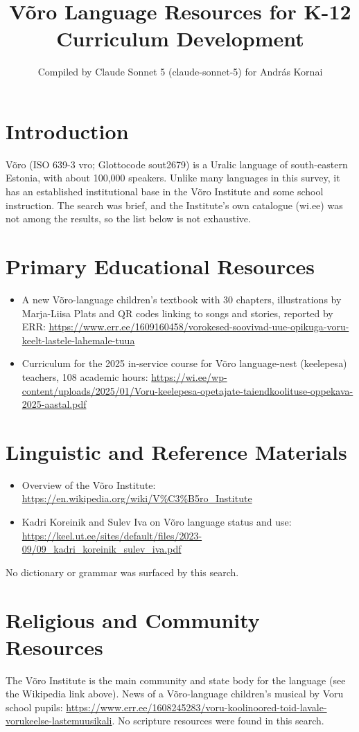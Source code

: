 \documentclass[12pt]{article}
\title{V\~oro Language Resources for K-12 Curriculum Development}
\author{Compiled by Claude Sonnet 5 (claude-sonnet-5) for Andr\'as Kornai}
\date{}
\begin{document}
\maketitle
\section{Introduction}
V\~oro (ISO 639-3 vro; Glottocode sout2679) is a Uralic language of south-eastern Estonia, with about 100,000 speakers. Unlike many languages in this survey, it has an established institutional base in the V\~oro Institute and some school instruction. The search was brief, and the Institute's own catalogue (wi.ee) was not among the results, so the list below is not exhaustive.
\section{Primary Educational Resources}
\begin{itemize}
\item A new V\~oro-language children's textbook with 30 chapters, illustrations by Marja-Liisa Plats and QR codes linking to songs and stories, reported by ERR: \url{https://www.err.ee/1609160458/vorokesed-soovivad-uue-opikuga-voru-keelt-lastele-lahemale-tuua}
\item Curriculum for the 2025 in-service course for V\~oro language-nest (keelepesa) teachers, 108 academic hours: \url{https://wi.ee/wp-content/uploads/2025/01/Voru-keelepesa-opetajate-taiendkoolituse-oppekava-2025-aastal.pdf}
\end{itemize}
\section{Linguistic and Reference Materials}
\begin{itemize}
\item Overview of the V\~oro Institute: \url{https://en.wikipedia.org/wiki/V%C3%B5ro_Institute}
\item Kadri Koreinik and Sulev Iva on V\~oro language status and use: \url{https://keel.ut.ee/sites/default/files/2023-09/09_kadri_koreinik_sulev_iva.pdf}
\end{itemize}
No dictionary or grammar was surfaced by this search.
\section{Religious and Community Resources}
The V\~oro Institute is the main community and state body for the language (see the Wikipedia link above). News of a V\~oro-language children's musical by Voru school pupils: \url{https://www.err.ee/1608245283/voru-koolinoored-toid-lavale-vorukeelse-lastemuusikali}. No scripture resources were found in this search.
\end{document}
